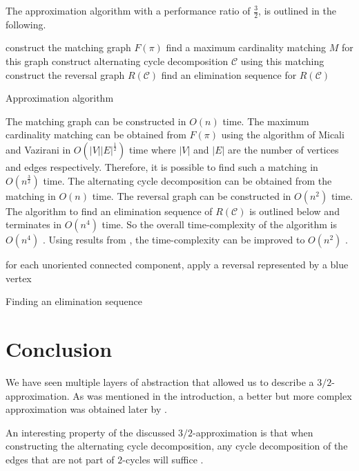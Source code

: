 \documentclass[11pt,DIV=11]{scrartcl}
\theoremstyle{definition}
\theoremstyle{remark}
\begin{document}
The approximation algorithm with a performance ratio of $\frac{3}{2}$, is outlined in the following.

\begin{algorithm}
    construct the matching graph $F(\pi)$\;
    find a maximum cardinality matching $M$ for this graph\;
    construct alternating cycle decomposition $\mathcal{C}$ using this matching\;
    construct the reversal graph $R(\mathcal{C})$\;
    find an elimination sequence for $R(\mathcal{C})$\;
    \caption{Approximation algorithm \cite{Christie1998}}
\end{algorithm}

The matching graph can be constructed in $O(n)$ time. The maximum cardinality matching can be obtained from $F(\pi)$ using the algorithm of Micali and Vazirani in $O(|V||E|^{\frac{1}{2}})$ time \cite{Micali1980} where $|V|$ and $|E|$ are the number of vertices and edges respectively. Therefore, it is possible to find such a matching in $O(n^{\frac{3}{2}})$ time. The alternating cycle decomposition can be obtained from the matching in $O(n)$ time. The reversal graph can be constructed in $O(n^2)$ time. The algorithm to find an elimination sequence of $R(\mathcal{C})$ is outlined below and terminates in $O(n^4)$ time. So the overall time-complexity of the algorithm is $O(n^4)$ \cite{Christie1998}. Using results from \citeauthor*{Kaplan1997}, the time-complexity can be improved to $O(n^2)$ \cite{Kaplan1997}.

\begin{algorithm}
    for each unoriented connected component, apply a reversal represented by a blue vertex\;
    \caption{Finding an elimination sequence \cite{Christie1998}}
\end{algorithm}

\section{Conclusion}
\label{sec:conclusion}

We have seen multiple layers of abstraction that allowed us to describe a $3/2$-approximation. As was mentioned in the introduction, a better but more complex approximation was obtained later by \citeauthor*{Berman2001}.

An interesting property of the discussed $3/2$-approximation is that when constructing the alternating cycle decomposition, any cycle decomposition of the edges that are not part of $2$-cycles will suffice \cite{Christie1998}.

\printbibliography
\end{document}
